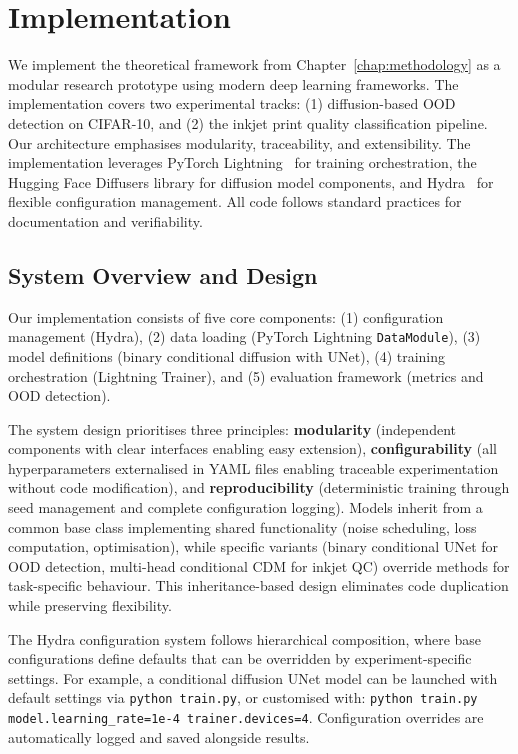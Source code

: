 \cleardoubleoddpage
\begingroup
\fontsize{11pt}{13.2pt}\selectfont
\chapter{Implementation}
\label{chap:implementation}

We implement the theoretical framework from Chapter~\ref{chap:methodology} as a modular research prototype using modern deep learning frameworks. The implementation covers two experimental tracks: (1) diffusion-based OOD detection on CIFAR-10, and (2) the inkjet print quality classification pipeline. Our architecture emphasises modularity, traceability, and extensibility. The implementation leverages PyTorch Lightning~\cite{falcon2019pytorch} for training orchestration, the Hugging Face Diffusers library for diffusion model components, and Hydra~\cite{yadan2019hydra} for flexible configuration management. All code follows standard practices for documentation and verifiability.


\section{System Overview and Design}
\label{sec:impl:system_overview}

Our implementation consists of five core components: (1) configuration management (Hydra), (2) data loading (PyTorch Lightning \texttt{DataModule}), (3) model definitions (binary conditional diffusion with UNet), (4) training orchestration (Lightning Trainer), and (5) evaluation framework (metrics and OOD detection).

The system design prioritises three principles: \textbf{modularity} (independent components with clear interfaces enabling easy extension), \textbf{configurability} (all hyperparameters externalised in YAML files enabling traceable experimentation without code modification), and \textbf{reproducibility} (deterministic training through seed management and complete configuration logging). Models inherit from a common base class implementing shared functionality (noise scheduling, loss computation, optimisation), while specific variants (binary conditional UNet for OOD detection, multi-head conditional CDM for inkjet QC) override methods for task-specific behaviour. This inheritance-based design eliminates code duplication while preserving flexibility.

The Hydra configuration system follows hierarchical composition, where base configurations define defaults that can be overridden by experiment-specific settings. For example, a conditional diffusion UNet model can be launched with default settings via \texttt{python train.py}, or customised with: \texttt{python train.py model.learning\_rate=1e-4 trainer.devices=4}. Configuration overrides are automatically logged and saved alongside results.

